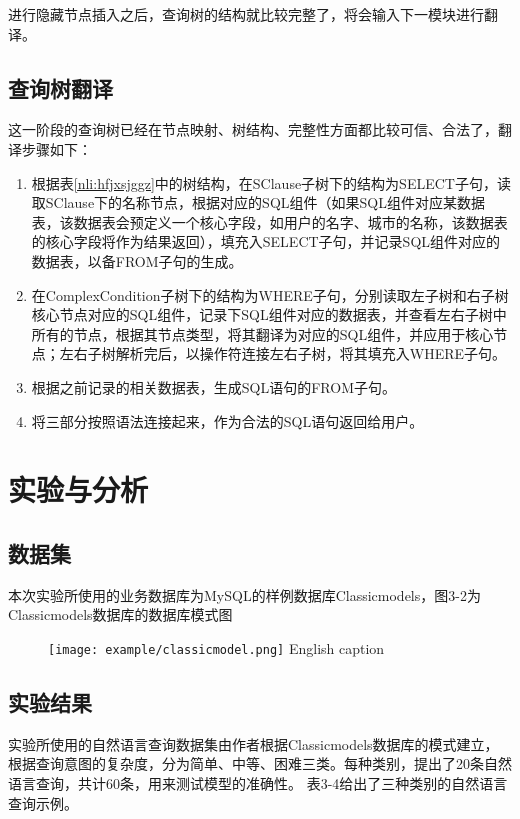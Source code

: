进行隐藏节点插入之后，查询树的结构就比较完整了，将会输入下一模块进行翻译。

\subsection{查询树翻译}
\label{nli:cxsfy}
这一阶段的查询树已经在节点映射、树结构、完整性方面都比较可信、合法了，翻译步骤如下：
\begin{enumerate}
    \item 根据表\ref{nli:hfjxsjggz}中的树结构，在SClause子树下的结构为SELECT子句，读取SClause下的名称节点，根据对应的SQL组件（如果SQL组件对应某数据表，该数据表会预定义一个核心字段，如用户的名字、城市的名称，该数据表的核心字段将作为结果返回），填充入SELECT子句，并记录SQL组件对应的数据表，以备FROM子句的生成。
    \item 在ComplexCondition子树下的结构为WHERE子句，分别读取左子树和右子树核心节点对应的SQL组件，记录下SQL组件对应的数据表，并查看左右子树中所有的节点，根据其节点类型，将其翻译为对应的SQL组件，并应用于核心节点；左右子树解析完后，以操作符连接左右子树，将其填充入WHERE子句。
    \item 根据之前记录的相关数据表，生成SQL语句的FROM子句。
    \item 将三部分按照语法连接起来，作为合法的SQL语句返回给用户。
\end{enumerate}

\section{实验与分析}

\subsection{数据集}
本次实验所使用的业务数据库为MySQL的样例数据库Classicmodels，图3-2为Classicmodels数据库的数据库模式图
\begin{figure}[!htp]
    \centering
    \texttt{[image: example/classicmodel.png]}
      {English caption}
    \label{fig:NLIclassicmodel}
  \end{figure}

\subsection{实验结果}

实验所使用的自然语言查询数据集由作者根据Classicmodels数据库的模式建立，根据查询意图的复杂度，分为简单、中等、困难三类。每种类别，提出了20条自然语言查询，共计60条，用来测试模型的准确性。
表3-4给出了三种类别的自然语言查询示例。

